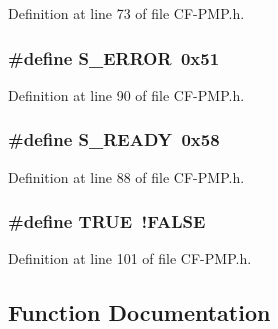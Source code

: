 Definition at line 73 of file C\+F-\/\+P\+M\+P.\+h.

\hypertarget{_c_f-_p_m_p_8h_af6e8cab5d0642b96ef462156816c3a28}{}
\subsubsection[{S\+\_\+\+E\+R\+R\+O\+R}]{\setlength{\rightskip}{0pt plus 5cm}\#define S\+\_\+\+E\+R\+R\+O\+R~0x51}\label{_c_f-_p_m_p_8h_af6e8cab5d0642b96ef462156816c3a28}


Definition at line 90 of file C\+F-\/\+P\+M\+P.\+h.

\hypertarget{_c_f-_p_m_p_8h_ae4b94c0e1e132ec39bb713033cf9c91d}{}
\subsubsection[{S\+\_\+\+R\+E\+A\+D\+Y}]{\setlength{\rightskip}{0pt plus 5cm}\#define S\+\_\+\+R\+E\+A\+D\+Y~0x58}\label{_c_f-_p_m_p_8h_ae4b94c0e1e132ec39bb713033cf9c91d}


Definition at line 88 of file C\+F-\/\+P\+M\+P.\+h.

\hypertarget{_c_f-_p_m_p_8h_aa8cecfc5c5c054d2875c03e77b7be15d}{}
\subsubsection[{T\+R\+U\+E}]{\setlength{\rightskip}{0pt plus 5cm}\#define T\+R\+U\+E~!{\bf F\+A\+L\+S\+E}}\label{_c_f-_p_m_p_8h_aa8cecfc5c5c054d2875c03e77b7be15d}


Definition at line 101 of file C\+F-\/\+P\+M\+P.\+h.



\subsection{Function Documentation}
\hypertarget{_c_f-_p_m_p_8h_a4027bb98ca68baf83d47a23636046ee5}{}
